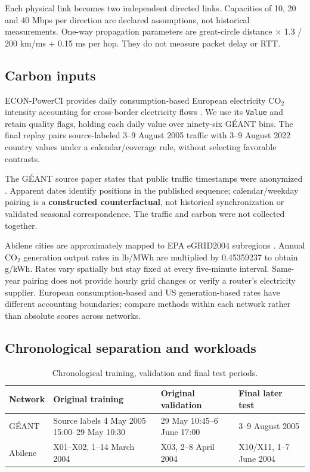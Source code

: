 \documentclass[conference,letterpaper]{IEEEtran}
\begin{document}
Each physical link becomes two independent directed links. Capacities of 10, 20 and 40 Mbps per direction are declared assumptions, not historical measurements. One-way propagation parameters are great-circle distance $\times$ 1.3 / 200 km/ms + 0.15 ms per hop. They do not measure packet delay or RTT.

\subsection{Carbon inputs}

ECON-PowerCI provides daily consumption-based European electricity CO$_2$ intensity accounting for cross-border electricity flows \cite{econ2025,econdata2025}. We use its \texttt{Value} and retain quality flags, holding each daily value over ninety-six GÉANT bins. The final replay pairs source-labeled 3--9 August 2005 traffic with 3--9 August 2022 country values under a calendar/coverage rule, without selecting favorable contrasts.

The GÉANT source paper states that public traffic timestamps were anonymized \cite{uhlig2006}. Apparent dates identify positions in the published sequence; calendar/weekday pairing is a \textbf{constructed counterfactual}, not historical synchronization or validated seasonal correspondence. The traffic and carbon were not collected together.

Abilene cities are approximately mapped to EPA eGRID2004 subregions \cite{epaegrid}. Annual CO$_2$ generation output rates in lb/MWh are multiplied by 0.45359237 to obtain g/kWh. Rates vary spatially but stay fixed at every five-minute interval. Same-year pairing does not provide hourly grid changes or verify a router's electricity supplier. European consumption-based and US generation-based rates have different accounting boundaries; compare methods within each network rather than absolute scores across networks.

\subsection{Chronological separation and workloads}


\begin{table}[!t]
\centering
\caption{Chronological training, validation and final test periods.}
\label{tab:1}
\footnotesize
\setlength{\tabcolsep}{4pt}
\begin{tabularx}{\textwidth}{p{.65in}YYY}
\toprule
\textbf{Network} & \textbf{Original training} & \textbf{Original validation} & \textbf{Final later test} \\
\midrule
GÉANT & Source labels 4 May 2005 15:00--29 May 10:30 & 29 May 10:45--6 June 17:00 & 3--9 August 2005 \\
Abilene & X01--X02, 1--14 March 2004 & X03, 2--8 April 2004 & X10/X11, 1--7 June 2004 \\
\bottomrule
\end{tabularx}
\end{table}
\end{document}
